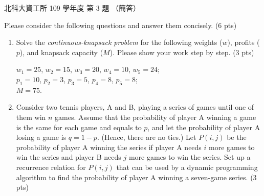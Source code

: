 \begin{pastexam}[label={px:ntut-109-ci-04}]{北科大資工所 109 學年度 第 3 題}
（簡答）

Please consider the following questions and answer them concisely. (6 pts)
\begin{enumerate}[label=(\arabic*)]
\item Solve the \textit{continuous-knapsack problem} for the following weights ($w$), profits ($p$),
and knapsack capacity ($M$). Please show your work step by step. (3 pts)
\begin{center}
$w_1=25$, $w_2=15$, $w_3=20$, $w_4=10$, $w_5=24$;\\
$p_1=10$, $p_2=3$, $p_3=5$, $p_4=8$, $p_5=8$;\\
$M=75$.
\end{center}
\item Consider two tennis players, A and B, playing a series of games until one of them win $n$
games. Assume that the probability of player A winning a game is the same for each game and equals
to $p$, and let the probability of player A losing a game is $q=1-p$. (Hence, there are no ties.)
Let $P(i,j)$ be the probability of player A winning the series if player A needs $i$ more games to
win the series and player B needs $j$ more games to win the series. Set up a recurrence relation for
$P(i,j)$ that can be used by a dynamic programming algorithm to find the probability of player A
winning a seven-game series. (3 pts)
\end{enumerate}
\end{pastexam}

